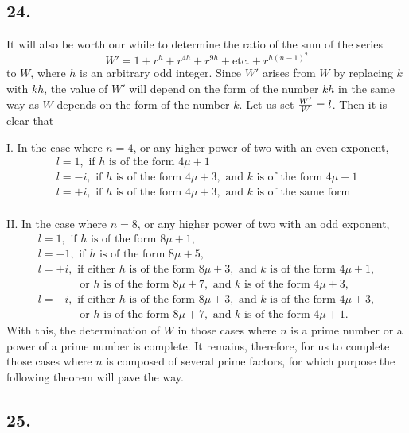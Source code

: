 \documentclass[twoside,12pt]{memoir}
\let\oldfrac\frac
\def\frac#1#2{\mathchoice{\tfrac{#1}{#2}}{\oldfrac{#1}{#2}}{\genfrac{}{}{}{2}{#1}{#2\mathstrut}}{\genfrac{}{}{}{3}{#1}{#2\mathstrut}}}
\begin{document}
\subsection*{24.}

It will also be worth our while to determine the ratio of the sum of the series
\[ W' = 1 + r^h + r^{4h} + r^{9h} + \text{etc{.}} + r^{h(n-1)^2} \]
to \(W\), where \(h\) is an arbitrary odd integer. Since \(W'\) arises from \(W\) by replacing \(k\) with \(kh\), the value of \(W'\) will depend on the form of the number \(kh\) in the same way as \(W\) depends on the form of the number \(k\). Let us set \(\frac{W'}{W} = l\).  Then it is clear that

I. In the case where \(n = 4\), or any higher power of two with an even exponent,
\[\begin{array}{l}
l = 1,\text{ if }h\text{ is of the form }4\mu+1\\ 
l = -i,\text{ if }h\text{ is of the form }4\mu+3,\text{ and }k\text{ is of the form }4\mu+1\\
l = +i,\text{ if }h\text{ is of the form }4\mu+3,\text{ and }k\text{ is of the same form}\\
\end{array}\]\pagebreak%

II. In the case where \(n = 8\), or any higher power of two with an odd exponent,
\[\begin{array}{l} 
l = 1, \text{ if }h\text{ is of the form }8\mu+1, \\
l = -1, \text{ if }h\text{ is of the form }8\mu+5, \\
l = +i, \text{ if either }h\text{ is of the form }8\mu+3, \text{ and } k\text{ is of the form }4\mu+1,\\
\phantom{l = +i} \quad \text{or }h\text{ is of the form }8\mu+7, \text{ and } k\text{ is of the form }4\mu+3,\\
l = -i, \text{ if either }h\text{ is of the form }8\mu+3, \text{ and } k\text{ is of the form }4\mu+3, \\
\phantom{l = -i}\quad \text{or }h\text{ is of the form }8\mu+7, \text{ and } k\text{ is of the form }4\mu+1.
\end{array}\]
With this, the determination of \(W\) in those cases where \(n\) is a prime number or a power of a prime number is complete. It remains, therefore, for us to complete those cases where \(n\) is composed of several prime factors, for which purpose the following theorem will pave the way.

\subsection*{25.}
\end{document}
